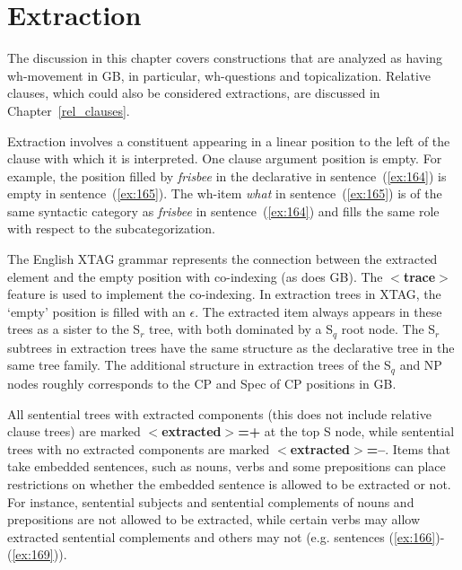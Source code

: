 \chapter{Extraction} 
\label{extraction} 
 
The discussion in this chapter covers constructions that are analyzed 
as having wh-movement in GB, in particular, wh-questions and 
topicalization. Relative clauses, which could also be considered 
extractions, are discussed in Chapter~\ref{rel_clauses}. 
 
Extraction involves a constituent appearing in a linear position to the left of 
the clause with which it is interpreted. One clause argument position is 
empty. For example, the position filled by {\it frisbee} in the declarative in 
sentence~(\ref{ex:164}) is empty in sentence~(\ref{ex:165}). The wh-item {\it what} in 
sentence~(\ref{ex:165}) is of the same syntactic category as {\it frisbee} in 
sentence~(\ref{ex:164}) and fills the same role with respect to the 
subcategorization. 
 
\beginsentences
{}\label{ex:164} 
\label{ex:165} 
\endsentences

 
 
The English XTAG grammar represents the connection between the extracted 
element and the empty position with co-indexing (as does GB).  The {\bf $<$trace$>$} feature is used to implement the co-indexing.  In extraction trees 
in XTAG, the `empty' position is filled with an {\it $\epsilon$}.  The 
extracted item always appears in these trees as a sister to the S$_{r}$ 
tree, with both dominated by a S$_{q}$ root node.  The S$_{r}$ subtrees in 
extraction trees have the same structure as the declarative tree in the same 
tree family.  The additional structure in extraction trees of the S$_{q}$ and 
NP nodes roughly corresponds to the CP and Spec of CP positions in GB. 
 
All sentential trees with extracted components (this does not include relative 
clause trees) are marked {\bf $<$extracted$>$=+} at the top S node, while 
sentential trees with no extracted components are marked {\bf $<$extracted$>$=--}.  Items that take embedded sentences, such as nouns, verbs 
and some prepositions can place restrictions on whether the embedded sentence 
is allowed to be extracted or not.  For instance, sentential subjects and 
sentential complements of nouns and prepositions are not allowed to be 
extracted, while certain verbs may allow extracted sentential complements and 
others may not (e.g. sentences (\ref{ex:166})-(\ref{ex:169})). 
 
